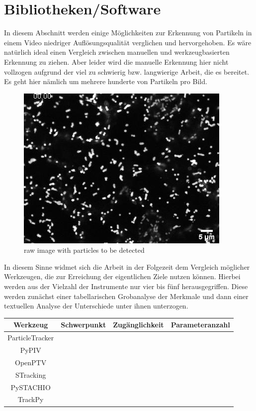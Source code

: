 \chapter{Bibliotheken/Software}

In diesem  Abschnitt werden einige Möglichkeiten zur Erkennung von Partikeln in einem Video niedriger Auflösungsqualität verglichen und hervorgehoben. Es wäre natürlich ideal einen Vergleich zwischen manuellen und werkzeugbasierten Erkennung zu ziehen. Aber leider wird die manuelle Erkennung hier nicht vollzogen aufgrund der viel zu schwierig bzw. langwierige Arbeit, die es bereitet. Es geht hier nämlich um mehrere hunderte von Partikeln pro Bild.\\
 
\begin{figure}[H]
    \centering
    \includegraphics[scale=0.9]{Grafiken/trackpyBilder/video-frame00001.png}
    \caption{raw image with particles to be detected}
    \label{fig:bild_label}
\end{figure}

In diesem Sinne widmet sich die Arbeit in der Folgezeit dem Vergleich möglicher Werkzeugen, die zur Erreichung der eigentlichen Ziele nutzen können. Hierbei werden aus der Vielzahl der Instrumente nur vier bis fünf herausgegriffen. Diese werden zunächst einer tabellarischen Grobanalyse der Merkmale und dann einer textuellen Analyse der Unterschiede unter ihnen unterzogen.\\


\begin{tabular}{|c||c|c|l|}
\hline
Werkzeug & Schwerpunkt & Zugänglichkeit & Parameteranzahl \\
\hline
\hline
 ParticleTracker & & & \\
 \hline
 PyPIV   & & & \\
 \hline
 OpenPTV & & & \\
 \hline
 STracking  & & & \\
 \hline
 PySTACHIO  & & & \\
 \hline
 TrackPy  & & & \\
 \hline
\end{tabular}
\\

